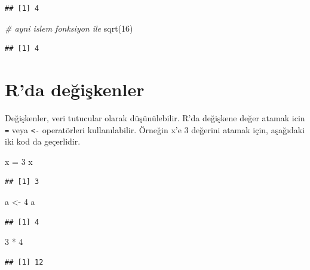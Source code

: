 \documentclass[
]{book}
\newenvironment{Shaded}{\begin{snugshade}}{\end{snugshade}}
\newcommand{\CommentTok}[1]{\textcolor[rgb]{0.56,0.35,0.01}{\textit{#1}}}
\newcommand{\DecValTok}[1]{\textcolor[rgb]{0.00,0.00,0.81}{#1}}
\newcommand{\FunctionTok}[1]{\textcolor[rgb]{0.00,0.00,0.00}{#1}}
\newcommand{\NormalTok}[1]{#1}
\newcommand{\OtherTok}[1]{\textcolor[rgb]{0.56,0.35,0.01}{#1}}
\newcommand{\SpecialCharTok}[1]{\textcolor[rgb]{0.00,0.00,0.00}{#1}}
\begin{document}
\begin{verbatim}
## [1] 4
\end{verbatim}

\begin{Shaded}
\begin{Highlighting}[]
\CommentTok{\# ayni islem fonksiyon ile}
\FunctionTok{sqrt}\NormalTok{(}\DecValTok{16}\NormalTok{) }
\end{Highlighting}
\end{Shaded}

\begin{verbatim}
## [1] 4
\end{verbatim}

\hypertarget{rda-deux11fiux15fkenler}{%
\section{R'da değişkenler}\label{rda-deux11fiux15fkenler}}

Değişkenler, veri tutucular olarak düşünülebilir. R'da değişkene değer atamak icin \texttt{=} veya \texttt{\textless{}-} operatörleri kullanılabilir. Örneğin x'e 3 değerini atamak için, aşağıdaki iki kod da geçerlidir.

\begin{Shaded}
\begin{Highlighting}[]
\NormalTok{x }\OtherTok{=} \DecValTok{3}
\NormalTok{x}
\end{Highlighting}
\end{Shaded}

\begin{verbatim}
## [1] 3
\end{verbatim}

\begin{Shaded}
\begin{Highlighting}[]
\NormalTok{a }\OtherTok{\textless{}{-}} \DecValTok{4}
\NormalTok{a}
\end{Highlighting}
\end{Shaded}

\begin{verbatim}
## [1] 4
\end{verbatim}

\begin{Shaded}
\begin{Highlighting}[]
\DecValTok{3} \SpecialCharTok{*} \DecValTok{4}
\end{Highlighting}
\end{Shaded}

\begin{verbatim}
## [1] 12
\end{verbatim}
\end{document}
